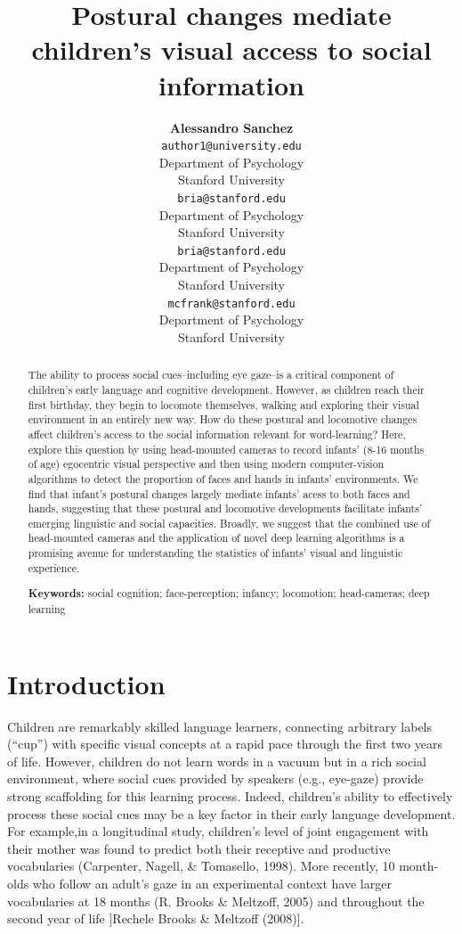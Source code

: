 \documentclass[10pt, letterpaper]{article}
\title{Postural changes mediate children's visual access to social information}
\author{{\large \bf Alessandro Sanchez} \\ \texttt{author1@university.edu} \\ Department of Psychology \\ Stanford University \And {\large \bf Bria Long} \\ \texttt{bria@stanford.edu} \\ Department of Psychology \\ Stanford University
    \And {\large \bf Ally Kraus} \\ \texttt{bria@stanford.edu} \\ Department of Psychology \\ Stanford University
    \And {\large \bf Michael C. Frank} \\ \texttt{mcfrank@stanford.edu} \\ Department of Psychology \\ Stanford University}
\begin{document}
\maketitle

\begin{abstract}
The ability to process social cues--including eye gaze--is a critical
component of children's early language and cognitive development.
However, as children reach their first birthday, they begin to locomote
themselves, walking and exploring their visual environment in an
entirely new way. How do these postural and locomotive changes affect
children's access to the social information relevant for word-learning?
Here, explore this question by using head-mounted cameras to record
infants' (8-16 months of age) egocentric visual perspective and then
using modern computer-vision algorithms to detect the proportion of
faces and hands in infants' environments. We find that infant's postural
changes largely mediate infants' acess to both faces and hands,
suggesting that these postural and locomotive developments facilitate
infants' emerging linguistic and social capacities. Broadly, we suggest
that the combined use of head-mounted cameras and the application of
novel deep learning algorithms is a promising avenue for understanding
the statistics of infants' visual and linguistic experience.

\textbf{Keywords:}
social cognition; face-perception; infancy; locomotion; head-cameras;
deep learning
\end{abstract}

\section{Introduction}\label{introduction}

Children are remarkably skilled language learners, connecting arbitrary
labels (``cup'') with specific visual concepts at a rapid pace through
the first two years of life. However, children do not learn words in a
vacuum but in a rich social environment, where social cues provided by
speakers (e.g., eye-gaze) provide strong scaffolding for this learning
process. Indeed, children's ability to effectively process these social
cues may be a key factor in their early language development. For
example,in a longitudinal study, children's level of joint engagement
with their mother was found to predict both their receptive and
productive vocabularies (Carpenter, Nagell, \& Tomasello, 1998). More
recently, 10 month-olds who follow an adult's gaze in an experimental
context have larger vocabularies at 18 months (R. Brooks \& Meltzoff,
2005) and throughout the second year of life {]}Rechele Brooks \&
Meltzoff (2008){]}.
\end{document}
